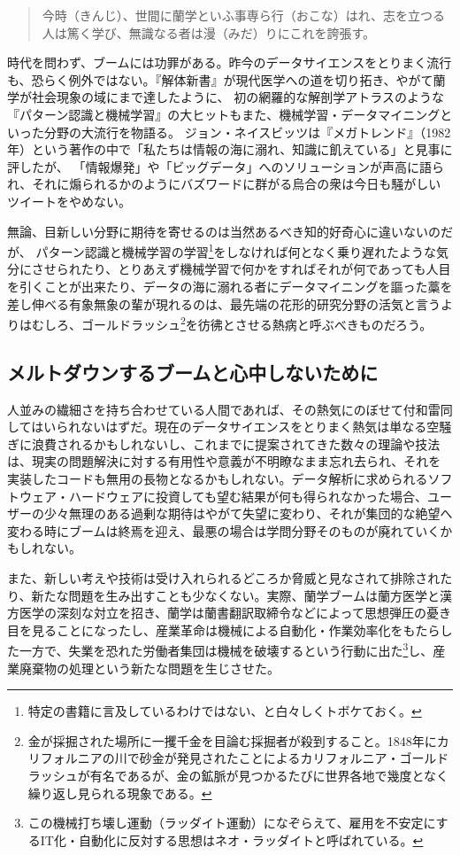 \begin{quote}
今時（きんじ）、世間に蘭学といふ事専ら行（おこな）はれ、志を立つる人は篤く学び、無識なる者は漫（みだ）りにこれを誇張す。
\end{quote}

時代を問わず、ブームには功罪がある。昨今のデータサイエンスをとりまく流行も、恐らく例外ではない。『解体新書』が現代医学への道を切り拓き、やがて蘭学が社会現象の域にまで達したように、
初の網羅的な解剖学アトラスのような『パターン認識と機械学習』の大ヒットもまた、機械学習・データマイニングといった分野の大流行を物語る。
ジョン・ネイスビッツは『メガトレンド』（1982年）という著作の中で「私たちは情報の海に溺れ、知識に飢えている」と見事に評したが、
「情報爆発」や「ビッグデータ」へのソリューションが声高に語られ、それに煽られるかのようにバズワードに群がる烏合の衆は今日も騒がしいツイートをやめない。

無論、目新しい分野に期待を寄せるのは当然あるべき知的好奇心に違いないのだが、
パターン認識と機械学習の学習\footnote{特定の書籍に言及しているわけではない、と白々しくトボケておく。}をしなければ何となく乗り遅れたような気分にさせられたり、とりあえず機械学習で何かをすればそれが何であっても人目を引くことが出来たり、データの海に溺れる者にデータマイニングを謳った藁を差し伸べる有象無象の輩が現れるのは、最先端の花形的研究分野の活気と言うよりはむしろ、ゴールドラッシュ\footnote{金が採掘された場所に一攫千金を目論む採掘者が殺到すること。1848年にカリフォルニアの川で砂金が発見されたことによるカリフォルニア・ゴールドラッシュが有名であるが、金の鉱脈が見つかるたびに世界各地で幾度となく繰り返し見られる現象である。}を彷彿とさせる熱病と呼ぶべきものだろう。

\subsection{メルトダウンするブームと心中しないために}
人並みの繊細さを持ち合わせている人間であれば、その熱気にのぼせて付和雷同してはいられないはずだ。現在のデータサイエンスをとりまく熱気は単なる空騒ぎに浪費されるかもしれないし、これまでに提案されてきた数々の理論や技法は、現実の問題解決に対する有用性や意義が不明瞭なまま忘れ去られ、それを実装したコードも無用の長物となるかもしれない。データ解析に求められるソフトウェア・ハードウェアに投資しても望む結果が何も得られなかった場合、ユーザーの少々無理のある過剰な期待はやがて失望に変わり、それが集団的な絶望へ変わる時にブームは終焉を迎え、最悪の場合は学問分野そのものが廃れていくかもしれない。

また、新しい考えや技術は受け入れられるどころか脅威と見なされて排除されたり、新たな問題を生み出すことも少なくない。実際、蘭学ブームは蘭方医学と漢方医学の深刻な対立を招き、蘭学は蘭書翻訳取締令などによって思想弾圧の憂き目を見ることになったし、産業革命は機械による自動化・作業効率化をもたらした一方で、失業を恐れた労働者集団は機械を破壊するという行動に出た\footnote{この機械打ち壊し運動（ラッダイト運動）になぞらえて、雇用を不安定にするIT化・自動化に反対する思想はネオ・ラッダイトと呼ばれている。}し、産業廃棄物の処理という新たな問題を生じさせた。

